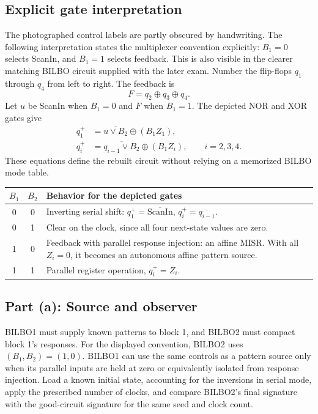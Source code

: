 \subsection{Explicit gate interpretation}
The photographed control labels are partly obscured by handwriting. The following interpretation states the multiplexer convention explicitly: $B_1=0$ selects ScanIn, and $B_1=1$ selects feedback. This is also visible in the clearer matching BILBO circuit supplied with the later exam. Number the flip-flops $q_1$ through $q_4$ from left to right. The feedback is
\[
F=q_2\oplus q_3\oplus q_4.
\]
Let $u$ be ScanIn when $B_1=0$ and $F$ when $B_1=1$. The depicted NOR and XOR gates give
\begin{align*}
q_1^+&=\overline{u\lor B_2}\oplus(B_1Z_1),\\
q_i^+&=\overline{q_{i-1}\lor B_2}\oplus(B_1Z_i),\qquad i=2,3,4.
\end{align*}
These equations define the rebuilt circuit without relying on a memorized BILBO mode table.
\begin{center}\small
\begin{tabular}{ccp{100mm}}
\toprule $B_1$&$B_2$&Behavior for the depicted gates\\\midrule
0&0&Inverting serial shift: $q_1^+=\overline{\mathrm{ScanIn}}$, $q_i^+=\overline{q_{i-1}}$.\\
0&1&Clear on the clock, since all four next-state values are zero.\\
1&0&Feedback with parallel response injection: an affine MISR. With all $Z_i=0$, it becomes an autonomous affine pattern source.\\
1&1&Parallel register operation, $q_i^+=Z_i$.\\
\bottomrule
\end{tabular}\end{center}

\subsection{Part (a): Source and observer}
BILBO1 must supply known patterns to block 1, and BILBO2 must compact block 1's responses. For the displayed convention, BILBO2 uses $(B_1,B_2)=(1,0)$. BILBO1 can use the same controls as a pattern source only when its parallel inputs are held at zero or equivalently isolated from response injection. Load a known initial state, accounting for the inversions in serial mode, apply the prescribed number of clocks, and compare BILBO2's final signature with the good-circuit signature for the same seed and clock count.

